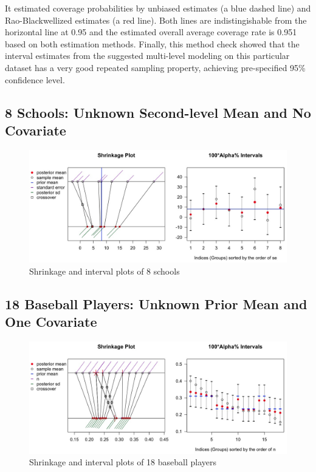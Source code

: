 \documentclass[article]{jss}
\begin{document}
It estimated coverage probabilities by unbiased estimates (a blue dashed line) and Rao-Blackwellized estimates (a red line). Both lines are indistingishable from the horizontal line at 0.95 and the estimated overall average coverage rate is 0.951 based on both estimation methods. Finally, this method check showed that the interval estimates from the suggested multi-level modeling on this particular dataset has a very good repeated sampling property, achieving pre-specified 95\% confidence level.

\subsection[Unknown Second-level Mean and No Covariate]{8 Schools: Unknown Second-level Mean and No Covariate}
\begin{figure}[h]
\begin{center}
\includegraphics[scale=0.3]{school1.png}
\caption{Shrinkage and interval plots of 8 schools}
\end{center}
\end{figure}

\subsection[Unknown Second-level Mean and One Covariate]{18 Baseball Players: Unknown Prior Mean and One Covariate}
\begin{figure}[h]
\begin{center}
\includegraphics[scale=0.3]{baseball1.png}
\caption{Shrinkage and interval plots of 18 baseball players}
\end{center}
\end{figure}
\end{document}
